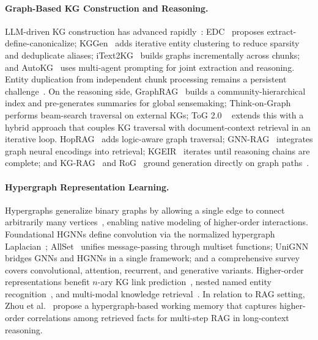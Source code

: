 \documentclass[runningheads]{llncs}
\begin{document}
\paragraph{Graph-Based KG Construction and Reasoning.}
LLM-driven KG construction has advanced rapidly~\cite{bian2025llm}: EDC~\cite{zhang2024extract}
proposes extract-define-canonicalize; KGGen~\cite{mo2025kggen} adds iterative entity
clustering to reduce sparsity and deduplicate aliases; iText2KG~\cite{lairgi2024itext2kg}
builds graphs incrementally across chunks; and AutoKG~\cite{zhu2024llms} uses multi-agent
prompting for joint extraction and reasoning.
Entity duplication from independent chunk processing remains a persistent
challenge~\cite{chen2025large,meher2025link}.
On the reasoning side, GraphRAG~\cite{edge2024local} builds a community-hierarchical index
and pre-generates summaries for global sensemaking; Think-on-Graph ~\cite{sun2023think} performs beam-search traversal on external KGs; ToG 2.0 ~\cite{ma2024think} extends this with a hybrid approach that couples KG traversal with document-context retrieval in an iterative loop.
HopRAG~\cite{liu2025hoprag} adds logic-aware graph traversal; GNN-RAG~\cite{mavromatis2024gnn}
integrates graph neural encodings into retrieval; KGEIR~\cite{sun2025kgeir} iterates
until reasoning chains are complete; and KG-RAG~\cite{sanmartin2024kg} and
RoG~\cite{luo2023reasoning} ground generation directly on graph paths~\cite{chen2024llm}.

\paragraph{Hypergraph Representation Learning.}
Hypergraphs generalize binary graphs by allowing a single edge to connect arbitrarily many
vertices~\cite{antelmi2023survey}, enabling native modeling of higher-order
interactions. Foundational HGNNs define convolution via the normalized hypergraph
Laplacian~\cite{feng2019hypergraph}; AllSet~\cite{chien2021you} unifies message-passing through
multiset functions; UniGNN~\cite{huang2021unignn} bridges GNNs and HGNNs in a single
framework; and a comprehensive survey~\cite{kim2024survey} covers convolutional, attention,
recurrent, and generative variants. Higher-order representations benefit $n$-ary KG link
prediction~\cite{wei2025survey}, nested named entity recognition~\cite{yan2023nested}, and
multi-modal knowledge retrieval~\cite{zeng2023multi}. In relation to RAG setting,
Zhou et al.~\cite{zhou2025improving} propose a hypergraph-based working memory that captures higher-order correlations among retrieved facts for multi-step RAG in long-context reasoning.
\end{document}
